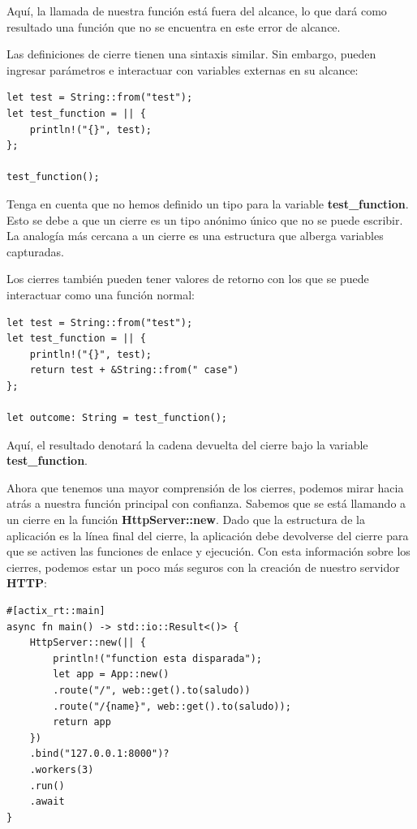 Aquí, la llamada de nuestra función está fuera del alcance, lo que dará como resultado una función que no se encuentra en este error de alcance.

Las definiciones de cierre tienen una sintaxis similar. Sin embargo, pueden ingresar parámetros e interactuar con variables externas en su alcance:

\begin{lstlisting}
let test = String::from("test");
let test_function = || {
	println!("{}", test);
};

test_function();
\end{lstlisting}

Tenga en cuenta que no hemos definido un tipo para la variable \textbf{test\_function}. Esto se debe a que un cierre es un tipo anónimo único que no se puede escribir. La analogía más cercana a un cierre es una estructura que alberga variables capturadas.

Los cierres también pueden tener valores de retorno con los que se puede interactuar como una función normal:

\begin{lstlisting}
let test = String::from("test");
let test_function = || {
	println!("{}", test);
	return test + &String::from(" case")
};

let outcome: String = test_function();
\end{lstlisting}

Aquí, el resultado denotará la cadena devuelta del cierre bajo la variable \textbf{test\_function}.

Ahora que tenemos una mayor comprensión de los cierres, podemos mirar hacia atrás a nuestra función principal con confianza. Sabemos que se está llamando a un cierre en la función \textbf{HttpServer::new}. Dado que la estructura de la aplicación es la línea final del cierre, la aplicación debe devolverse del cierre para que se activen las funciones de enlace y ejecución. Con esta información sobre los cierres, podemos estar un poco más seguros con la creación de nuestro servidor \textbf{HTTP}:


\begin{lstlisting}
#[actix_rt::main]
async fn main() -> std::io::Result<()> {
	HttpServer::new(|| {
		println!("function esta disparada");
		let app = App::new()
		.route("/", web::get().to(saludo))
		.route("/{name}", web::get().to(saludo));
		return app
	})
	.bind("127.0.0.1:8000")?
	.workers(3)
	.run()
	.await
}
\end{lstlisting}

